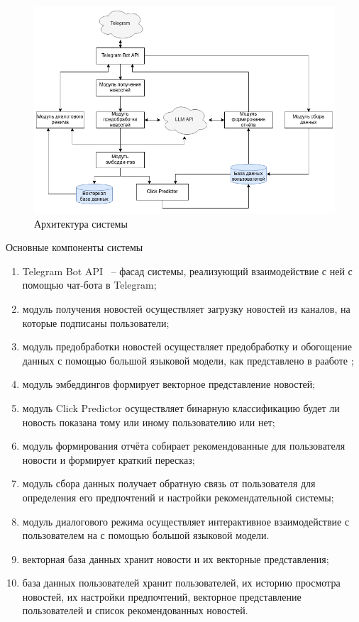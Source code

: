 \begin{figure}[h]
    \centering
    \includegraphics[width=\linewidth]{../images/system_architecture.drawio.png}
    \caption{Архитектура системы}
    \label{img:system_architecture}
\end{figure}

Основные компоненты системы
\begin{enumerate}
    \item Telegram Bot API ~-- фасад системы, реализующий взаимодействие с ней с помощью чат-бота в Telegram;
    \item модуль получения новостей осуществляет загрузку новостей из каналов, на которые подписаны пользователи;
    \item модуль предобработки новостей осуществляет предобработку и обогощение данных с помощью большой языковой модели, как представлено в рааботе \cite{news_rec_gen};
    \item модуль эмбеддингов формирует векторное представление новостей;
    \item модуль Click Predictor осуществляет бинарную классификацию будет ли новость показана тому или иному пользователию или нет;
    \item модуль формирования отчёта собирает рекомендованные для  пользователя новости и формирует краткий пересказ;
    \item модуль сбора данных получает обратную связь от пользователя для определения его предпочтений и настройки рекомендательной системы;
    \item модуль диалогового режима осуществляет интерактивное взаимодействие с пользователем на с помощью большой языковой модели.
    \item векторная база данных хранит новости и их векторные представления;
    \item база данных пользователей хранит пользователей, их историю просмотра новостей, их настройки предпочтений, векторное представление пользователей и список рекомендованных новостей.
\end{enumerate}

